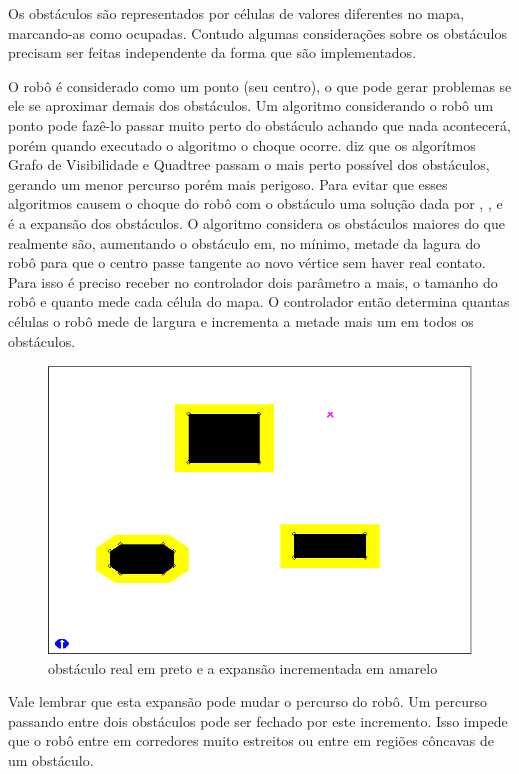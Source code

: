 Os obstáculos são representados por células de valores diferentes no mapa, marcando-as como ocupadas. Contudo algumas considerações sobre os obstáculos precisam ser feitas independente da forma que são implementados.

O robô é considerado como um ponto (seu centro), o que pode gerar problemas se ele se aproximar demais dos obstáculos. Um algoritmo considerando o robô um ponto pode fazê-lo passar muito perto do obstáculo achando que nada acontecerá, porém quando executado o algoritmo o choque ocorre. \cite{Guzman2008} diz que os algorítmos Grafo de Visibilidade e Quadtree passam o mais perto possível dos obstáculos, gerando um menor percurso porém mais perigoso. Para evitar que esses algoritmos causem o choque do robô com o obstáculo uma solução dada por \cite{Souza2008}, \cite{Guzman2008}, \cite{Siegwart2004} e \cite{Thomsen2010} é a expansão dos obstáculos. O algoritmo considera os obstáculos maiores do que realmente são, aumentando o obstáculo em, no mínimo, metade da lagura do robô para que o centro passe tangente ao novo vértice sem haver real contato. Para isso é preciso receber no controlador dois parâmetro a mais, o tamanho do robô e quanto mede cada célula do mapa. O controlador então determina quantas células o robô mede de largura e incrementa a metade mais um em todos os obstáculos.

\begin{figure}[h]
	\centering
	\label{fig33}
		\includegraphics[keepaspectratio=true,scale=0.5]{figuras/expansao.png}
	\caption{obstáculo real em preto e a expansão incrementada em amarelo \cite{MRIT_SITE}}
\end{figure}

Vale lembrar que esta expansão pode mudar o percurso do robô. Um percurso passando entre dois obstáculos pode ser fechado por este incremento. Isso impede que o robô entre em corredores muito estreitos ou entre em regiões côncavas de um obstáculo.

